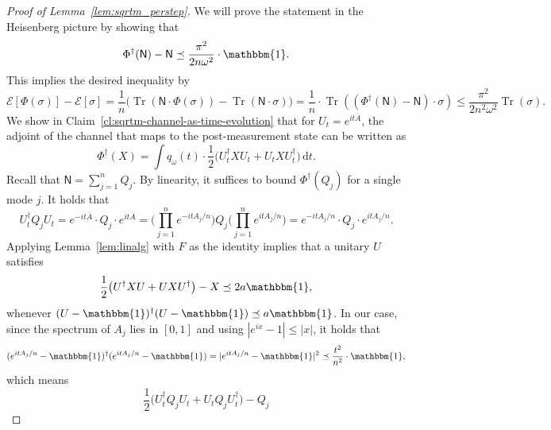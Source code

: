 \documentclass[10pt]{article}
\newcommand{\energy}{\mathcal{E}}
\newcommand{\luders}{\Phi}
\DeclareMathOperator{\Tr}{Tr}
\newcommand{\Id}{\mathbbm{1}}
\newcommand{\lift}[1]{\overline{#1}}
\begin{document}
\begin{proof}[Proof of Lemma~\ref{lem:sqrtm_perstep}]
    We will prove the statement in the Heisenberg picture by showing that
    \begin{equation*}
        \luders^{\dagger}(\mathsf{N}) - \mathsf{N}
        \preceq \frac{\pi^2}{2n\omega^2} \cdot \Id.
    \end{equation*}
    This implies the desired inequality by
    \begin{equation*}
        \energy[\luders(\sigma)] - \energy[\sigma]
        = \frac{1}{n}\Big( \Tr(\mathsf{N} \cdot \luders(\sigma)) - \Tr(\mathsf{N} \cdot \sigma)\Big)
        = \frac{1}{n} \cdot \Tr((\luders^{\dagger}(\mathsf{N}) - \mathsf{N}) \cdot \sigma)
        \leq \frac{\pi^2}{2n^2\omega^2} \Tr(\sigma).
    \end{equation*}
    We show in Claim~\ref{cl:sqrtm-channel-as-time-evolution} that for $U_t = e^{it\lift{A}}$, the adjoint of the channel that maps to the post-measurement state can be written as
    \begin{equation*}
        \luders^{\dagger}(X)
        = \int q_\omega(t) \cdot \frac{1}{2} \big(U_t^{\dagger} X U_t + U_t X U_t^{\dagger}\big) \,\mathrm{d}t.
    \end{equation*}
    Recall that $\mathsf{N} = \sum_{j=1}^n Q_j$. By linearity, it suffices to bound $\luders^{\dagger}(Q_j)$ for a single mode $j$.
    It holds that
    \begin{equation*}
        U_t^{\dagger} Q_j U_t
        = e^{-it\lift{A}} \cdot Q_j \cdot e^{it\lift{A}}
        = \Big(\prod_{j=1}^n e^{-itA_j/n}\Big) Q_j \Big(\prod_{j=1}^n e^{itA_j/n}\Big)
        = e^{-itA_j/n} \cdot Q_j \cdot e^{itA_j/n}.
    \end{equation*}
    Applying Lemma~\ref{lem:linalg} with $F$ as the identity implies that a unitary $U$ satisfies
    \begin{equation*}
        \frac{1}{2} \big(U^{\dagger} X U + U X U^{\dagger}\big) - X \preceq 2a\Id,
    \end{equation*}
    whenever $(U - \Id)^{\dagger}(U - \Id) \preceq a\Id$. In our case, since the spectrum of $A_j$ lies in $[0, 1]$ and using $|e^{ix} - 1| \leq |x|$, it holds that
    \begin{equation*}
        (e^{itA_j/n} - \Id)^{\dagger}(e^{itA_j/n} - \Id) = |e^{itA_j/n} - \Id|^2 \preceq \frac{t^2}{n^2} \cdot \Id,
    \end{equation*}
    which means
    \begin{equation}
        \frac{1}{2} \big(U_t^{\dagger} Q_j U_t + U_t Q_j U_t^{\dagger}\big) - Q_j

\end{equation}
\end{proof}
\end{document}
